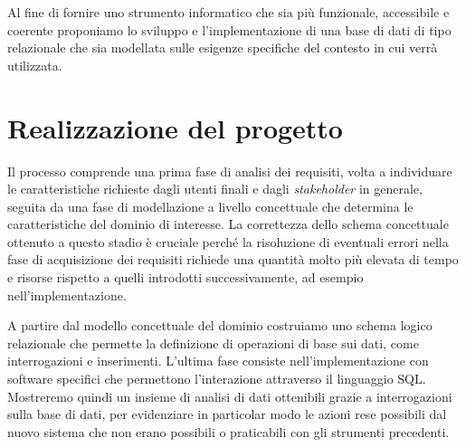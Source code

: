 Al fine di fornire uno strumento informatico che sia più funzionale, accessibile e coerente proponiamo lo sviluppo e l'implementazione di una base di dati di tipo relazionale che sia modellata sulle esigenze specifiche del contesto in cui verrà utilizzata.

\section{Realizzazione del progetto}

Il processo comprende una prima fase di analisi dei requisiti, volta a individuare le caratteristiche richieste dagli utenti finali e dagli \emph{stakeholder} in generale, seguita da una fase di modellazione a livello concettuale che determina le caratteristiche del dominio di interesse.
La correttezza dello schema concettuale ottenuto a questo stadio è cruciale perché la risoluzione di eventuali errori nella fase di acquisizione dei requisiti richiede una quantità molto più elevata di tempo e risorse rispetto a quelli introdotti successivamente, ad esempio nell'implementazione.

A partire dal modello concettuale del dominio costruiamo uno schema logico relazionale che permette la definizione di operazioni di base sui dati, come interrogazioni e inserimenti.
L'ultima fase consiste nell'implementazione con software specifici che permettono l'interazione attraverso il linguaggio SQL.
Mostreremo quindi un insieme di analisi di dati ottenibili grazie a interrogazioni sulla base di dati, per evidenziare in particolar modo le azioni rese possibili dal nuovo sistema che non erano possibili o praticabili con gli strumenti precedenti.

